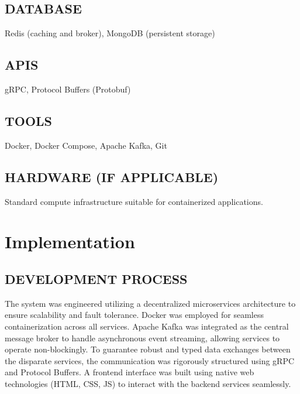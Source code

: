 \documentclass[12pt,a4paper]{article}
\begin{document}
\subsection*{DATABASE}
Redis (caching and broker), MongoDB (persistent storage)

\subsection*{APIS}
gRPC, Protocol Buffers (Protobuf)

\subsection*{TOOLS}
Docker, Docker Compose, Apache Kafka, Git

\subsection*{HARDWARE (IF APPLICABLE)}
Standard compute infrastructure suitable for containerized applications.

\section*{Implementation}

\subsection*{DEVELOPMENT PROCESS}
The system was engineered utilizing a decentralized microservices architecture to ensure scalability and fault tolerance. Docker was employed for seamless containerization across all services. Apache Kafka was integrated as the central message broker to handle asynchronous event streaming, allowing services to operate non-blockingly. To guarantee robust and typed data exchanges between the disparate services, the communication was rigorously structured using gRPC and Protocol Buffers. A frontend interface was built using native web technologies (HTML, CSS, JS) to interact with the backend services seamlessly.
\end{document}
